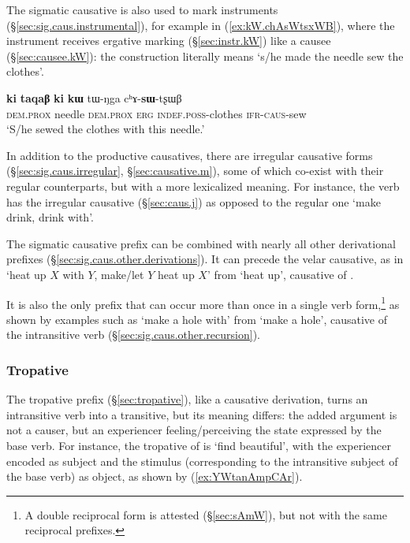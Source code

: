 The sigmatic causative is also used to mark instruments (§\ref{sec:sig.caus.instrumental}), for example in (\ref{ex:kW.chAsWtsxWB}), where the instrument  receives  ergative marking (§\ref{sec:instr.kW}) like a causee (§\ref{sec:causee.kW}): the construction literally means `s/he made the needle sew the clothes'.


\begin{exe}
\ex  \label{ex:kW.chAsWtsxWB}
\gll  \textbf{ki} \textbf{taqaβ} \textbf{ki} \textbf{kɯ} tɯ-ŋga cʰɤ-\textbf{sɯ}-tʂɯβ  \\
 \textsc{dem}.\textsc{prox} needle \textsc{dem}.\textsc{prox} \textsc{erg} \textsc{indef}.\textsc{poss}-clothes \textsc{ifr}-\textsc{caus}-sew \\
\glt `S/he sewed the clothes with this needle.' 
\end{exe}

In addition to the productive causatives, there are irregular causative forms (§\ref{sec:sig.caus.irregular}, §\ref{sec:causative.m}), some of which co-exist with their regular counterparts, but with a more lexicalized meaning. For instance, the verb  has the irregular causative  (§\ref{sec:caus.j}) as opposed to the regular one  `make drink, drink with'.

The sigmatic causative prefix can be combined with nearly all other derivational prefixes (§\ref{sec:sig.caus.other.derivations}). It can precede the velar causative, as in  `heat up $X$ with $Y$, make/let $Y$ heat up $X$' from  `heat up', causative of . 

It is also the only prefix that can occur more than once in a single verb form,\footnote{A double reciprocal form is attested (§\ref{sec:sAmW}), but not with the same reciprocal prefixes. } as shown by examples such as  `make a hole with' from  `make a hole', causative of the intransitive verb  (§\ref{sec:sig.caus.other.recursion}). 


\subsubsection{Tropative}
The tropative  prefix (§\ref{sec:tropative}), like a causative derivation, turns an intransitive verb into a transitive, but its meaning differs: the added argument is not a causer, but an experiencer feeling/perceiving the state expressed by the base verb. For instance, the tropative of  is  `find beautiful', with the experiencer encoded as subject and the stimulus (corresponding to the intransitive subject of the base verb) as object, as shown by (\ref{ex:YWtanAmpCAr}).

